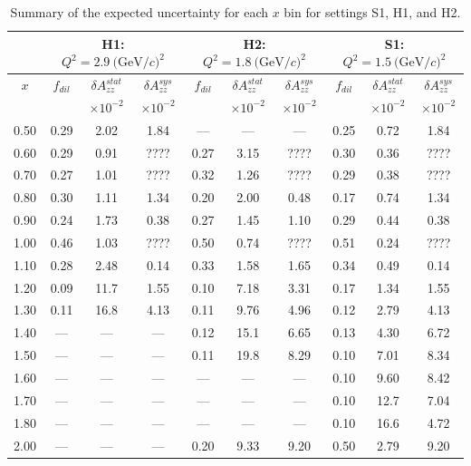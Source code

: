 \begin{table}
\begin{center}
\begin{tabular}{c|ccc|ccc|ccc}
 ~ & \multicolumn{3}{|c}{H1: $Q^2=2.9\mathrm{~(GeV/}c)^2$} & \multicolumn{3}{|c}{H2: $Q^2=1.8\mathrm{~(GeV/}c)^2$} & \multicolumn{3}{|c}{S1: $Q^2=1.5\mathrm{~(GeV/}c)^2$} \\
 \hline
  $x$  & $f_{dil}$ & $\delta A_{zz}^{stat}$ & $\delta A_{zz}^{sys}$ & $f_{dil}$ & $\delta A_{zz}^{stat}$ & $\delta A_{zz}^{sys}$ & $f_{dil}$ & $\delta A_{zz}^{stat}$ & $\delta A_{zz}^{sys}$ \\
  &     & $\times 10^{-2}$  & $\times 10^{-2}$  &    & $\times 10^{-2}$  & $\times 10^{-2}$ &    & $\times 10^{-2}$  & $\times 10^{-2}$ \\
\hline\hline
 0.50   &  0.29	 & 2.02	& 1.84	& ---	& ---	& ---	& 0.25	& 0.72	& 1.84 \\
 0.60   &  0.29	 & 0.91	& ????	& 0.27	& 3.15	& ????	& 0.30	& 0.36	& ???? \\ 
 0.70   &  0.27	 & 1.01	& ????	& 0.32	& 1.26	& ????	& 0.29	& 0.38	& ???? \\
 0.80	&  0.30	 & 1.11	& 1.34	& 0.20	& 2.00	& 0.48	& 0.17	& 0.74	& 1.34 \\
 0.90	&  0.24	 & 1.73 	& 0.38 	& 0.27	& 1.45	& 1.10	& 0.29	& 0.44	& 0.38 \\
 1.00	&  0.46	 & 1.03	& ???? 	& 0.50	& 0.74	& ????	& 0.51	& 0.24	& ???? \\
 1.10	&  0.28	 & 2.48	& 0.14 	& 0.33	& 1.58	& 1.65	& 0.34	& 0.49	& 0.14 \\
 1.20	&  0.09	 & 11.7	& 1.55 	& 0.10	& 7.18	& 3.31	& 0.17	& 1.34	& 1.55 \\
 1.30	&  0.11	 & 16.8	& 4.13 	& 0.11	& 9.76	& 4.96	& 0.12	& 2.79	& 4.13 \\
 1.40	&  ---	 & ---	& --- 	& 0.12	& 15.1	& 6.65	& 0.13	& 4.30	& 6.72 \\
 1.50	&  ---	 & ---	& ---	& 0.11	& 19.8	& 8.29	& 0.10	& 7.01	& 8.34 \\
 1.60	&  ---	 & ---	& --- 	& ---	& ---	& ---	& 0.10	& 9.60	& 8.42 \\
 1.70	&  ---	 & ---	& --- 	& ---	& ---	& ---	& 0.10	& 12.7	& 7.04 \\
 1.80	&  ---	 & ---	& --- 	& ---	& ---	& ---	& 0.10	& 16.6	& 4.72 \\
 2.00   &  ---	 & ---	& ---	& 0.20	& 9.33	& 9.20	& 0.50	& 2.79	& 9.20 \\
\hline\hline
\end{tabular}
\caption{\label{RATES2}Summary of the expected uncertainty for each $x$ bin for settings S1, H1, and H2. }
\end{center}
\end{table}

